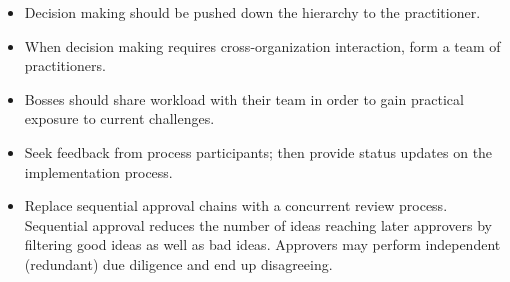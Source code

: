 \begin{itemize}
\item Decision making should be pushed down the hierarchy to the practitioner.
\item When decision making requires cross-organization interaction, form a team of practitioners.
\item Bosses should share workload with their team in order to gain practical exposure to current challenges.
\item Seek feedback from process participants; then provide status updates on the implementation process.
\item Replace sequential approval chains with a concurrent review process. Sequential approval reduces the number of ideas reaching later approvers by filtering good ideas as well as bad ideas. Approvers may perform independent (redundant) due diligence and end up disagreeing. 
\end{itemize}
